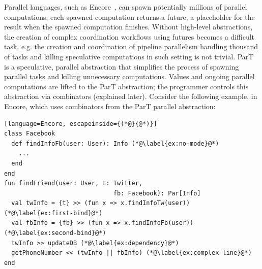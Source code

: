 \documentclass[sigplan]{acmart}
\begin{document}
Parallel languages, such as Encore~\cite{DBLP:conf/sfm/BrandauerCCFJPT15}, can spawn
potentially millions of parallel computations; each spawned computation
returns a future, a placeholder for the result when the spawned
computation finishes. Without high-level abstractions, the
creation of complex coordination workflows using futures becomes a difficult task,
e.g. the creation and coordination of pipeline parallelism handling thousand of tasks
and killing speculative computations in such setting is not trivial.
%
ParT~\cite{DBLP:conf/coordination/Fernandez-Reyes16} is a speculative, parallel abstraction that simplifies the process of
spawning parallel tasks and killing unnecessary computations. 
Values and ongoing parallel computations are
lifted to the ParT abstraction; the programmer controls this abstraction via combinators (explained later).
%
Consider the following example, in Encore, which
uses combinators from the ParT parallel abstraction:

\begin{lstlisting}[language=Encore, escapeinside={(*@}{@*)}]
class Facebook
  def findInfoFb(user: User): Info (*@\label{ex:no-mode}@*)
    ...
  end
end
fun findFriend(user: User, t: Twitter,
                              fb: Facebook): Par[Info]
  val twInfo = {t} >> (fun x => x.findInfoTw(user)) (*@\label{ex:first-bind}@*)
  val fbInfo = {fb} >> (fun x => x.findInfoFb(user)) (*@\label{ex:second-bind}@*)
  twInfo >> updateDB (*@\label{ex:dependency}@*)
  getPhoneNumber << (twInfo || fbInfo) (*@\label{ex:complex-line}@*)
end
\end{lstlisting}
\end{document}
